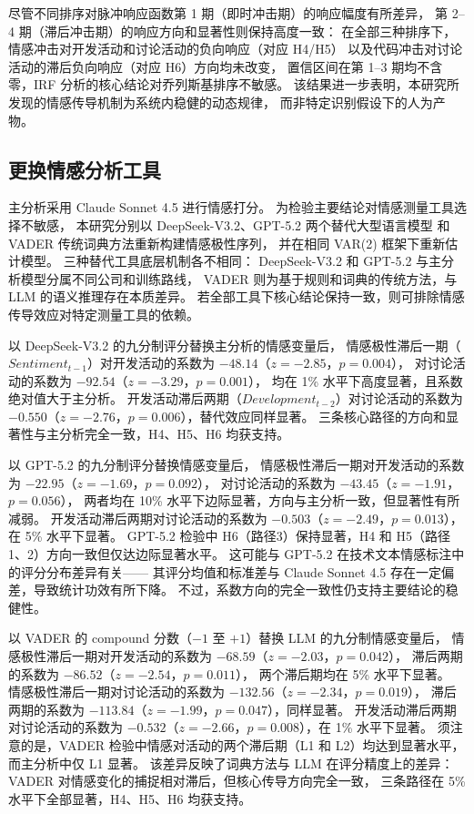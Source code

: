 尽管不同排序对脉冲响应函数第 1 期（即时冲击期）的响应幅度有所差异，
第 2--4 期（滞后冲击期）的响应方向和显著性则保持高度一致：
在全部三种排序下，情感冲击对开发活动和讨论活动的负向响应（对应 H4/H5）
以及代码冲击对讨论活动的滞后负向响应（对应 H6）方向均未改变，
置信区间在第 1--3 期均不含零，IRF 分析的核心结论对乔列斯基排序不敏感。
该结果进一步表明，本研究所发现的情感传导机制为系统内稳健的动态规律，
而非特定识别假设下的人为产物。

\subsection{更换情感分析工具}

主分析采用 Claude Sonnet 4.5 进行情感打分。
为检验主要结论对情感测量工具选择不敏感，
本研究分别以 DeepSeek-V3.2、GPT-5.2 两个替代大型语言模型
和 VADER 传统词典方法\cite{hutto2014vader}重新构建情感极性序列，
并在相同 VAR(2) 框架下重新估计模型。
三种替代工具底层机制各不相同：
DeepSeek-V3.2 和 GPT-5.2 与主分析模型分属不同公司和训练路线，
VADER 则为基于规则和词典的传统方法，与 LLM 的语义推理存在本质差异。
若全部工具下核心结论保持一致，则可排除情感传导效应对特定测量工具的依赖。

以 DeepSeek-V3.2 的九分制评分替换主分析的情感变量后，
情感极性滞后一期（$Sentiment_{t-1}$）对开发活动的系数为
$-48.14$（$z = -2.85$，$p = 0.004$），
对讨论活动的系数为 $-92.54$（$z = -3.29$，$p = 0.001$），
均在 1\% 水平下高度显著，且系数绝对值大于主分析。
开发活动滞后两期（$Development_{t-2}$）对讨论活动的系数为
$-0.550$（$z = -2.76$，$p = 0.006$），替代效应同样显著。
三条核心路径的方向和显著性与主分析完全一致，H4、H5、H6 均获支持。

以 GPT-5.2 的九分制评分替换情感变量后，
情感极性滞后一期对开发活动的系数为
$-22.95$（$z = -1.69$，$p = 0.092$），
对讨论活动的系数为 $-43.45$（$z = -1.91$，$p = 0.056$），
两者均在 10\% 水平下边际显著，方向与主分析一致，但显著性有所减弱。
开发活动滞后两期对讨论活动的系数为
$-0.503$（$z = -2.49$，$p = 0.013$），在 5\% 水平下显著。
GPT-5.2 检验中 H6（路径3）保持显著，H4 和 H5（路径1、2）方向一致但仅达边际显著水平。
这可能与 GPT-5.2 在技术文本情感标注中的评分分布差异有关——
其评分均值和标准差与 Claude Sonnet 4.5 存在一定偏差，导致统计功效有所下降。
不过，系数方向的完全一致性仍支持主要结论的稳健性。

以 VADER 的 compound 分数（$-1$ 至 $+1$）替换 LLM 的九分制情感变量后，
情感极性滞后一期对开发活动的系数为
$-68.59$（$z = -2.03$，$p = 0.042$），
滞后两期的系数为 $-86.52$（$z = -2.54$，$p = 0.011$），
两个滞后期均在 5\% 水平下显著。
情感极性滞后一期对讨论活动的系数为
$-132.56$（$z = -2.34$，$p = 0.019$），
滞后两期的系数为 $-113.84$（$z = -1.99$，$p = 0.047$），同样显著。
开发活动滞后两期对讨论活动的系数为
$-0.532$（$z = -2.66$，$p = 0.008$），在 1\% 水平下显著。
须注意的是，VADER 检验中情感对活动的两个滞后期（L1 和 L2）均达到显著水平，
而主分析中仅 L1 显著。
该差异反映了词典方法与 LLM 在评分精度上的差异：
VADER 对情感变化的捕捉相对滞后，但核心传导方向完全一致，
三条路径在 5\% 水平下全部显著，H4、H5、H6 均获支持。

